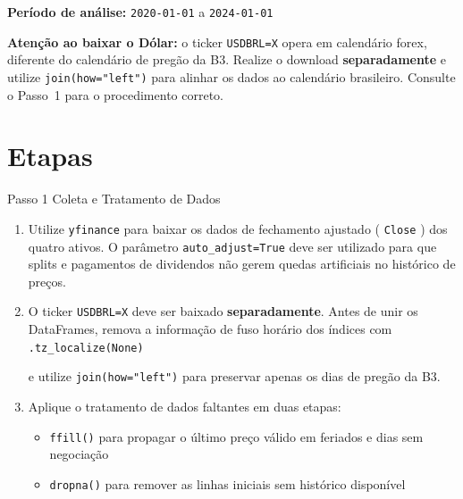 \documentclass[11pt,a4paper]{article}
\newcommand{\code}[1]{%
  \colorbox{quantlightgray}{\texttt{\small\color{quantdark}#1}}%
}
\begin{document}
\vspace{0.8em}
\noindent\textbf{Período de análise:}\quad
\code{2020-01-01} \textcolor{quantgray}{a} \code{2024-01-01}

\vspace{1.2em}

\begin{warningbox}
  \textbf{\textcolor{quantamber}{Atenção ao baixar o Dólar:}} o ticker \code{USDBRL=X} opera em
  calendário forex, diferente do calendário de pregão da B3. Realize o download \textbf{separadamente}
  e utilize \code{join(how="left")} para alinhar os dados ao calendário brasileiro. Consulte o
  Passo~1 para o procedimento correto.
\end{warningbox}

\newpage

\section{Etapas}

\begin{stepbox}{Passo 1 \quad Coleta e Tratamento de Dados}
\begin{enumerate}
  \item Utilize \code{yfinance} para baixar os dados de fechamento ajustado (\code{Close}) dos
        quatro ativos. O parâmetro \code{auto\_adjust=True} deve ser utilizado para que splits e
        pagamentos de dividendos não gerem quedas artificiais no histórico de preços.

  \item O ticker \code{USDBRL=X} deve ser baixado \textbf{separadamente}. Antes de unir os
        DataFrames, remova a informação de fuso horário dos índices com \code{.tz\_localize(None)}
        e utilize \code{join(how="left")} para preservar apenas os dias de pregão da B3.

  \item Aplique o tratamento de dados faltantes em duas etapas:
        \begin{itemize}
          \item \code{ffill()} para propagar o último preço válido em feriados e dias sem negociação
          \item \code{dropna()} para remover as linhas iniciais sem histórico disponível
        \end{itemize}
\end{enumerate}
\end{stepbox}
\end{document}
